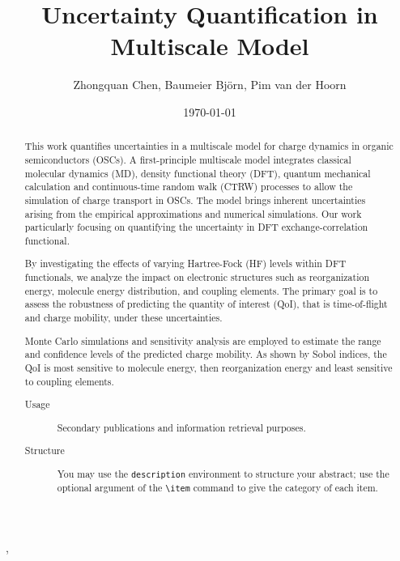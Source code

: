 \documentclass[%
 reprint,
 amsmath,amssymb,
 aps,
]{revtex4-2}
\begin{document}

\title{Uncertainty Quantification in Multiscale Model}%

\author{Zhongquan Chen, Baumeier Bj\"orn, Pim van der Hoorn}
 ,



\date{\today}%

\begin{abstract}
  This work quantifies uncertainties in a multiscale model for charge dynamics in organic semiconductors (OSCs). A first-principle multiscale model integrates classical molecular dynamics (MD), density functional theory (DFT), quantum mechanical calculation and continuous-time random walk (CTRW) processes to allow the simulation of charge transport in OSCs. The model brings inherent uncertainties arising from the empirical approximations and numerical simulations. Our work particularly focusing on quantifying the uncertainty in DFT exchange-correlation functional.

  By investigating the effects of varying Hartree-Fock (HF) levels within DFT functionals, we analyze the impact on electronic structures such as reorganization energy, molecule energy distribution, and coupling elements. The primary goal is to assess the robustness of predicting the quantity of interest (QoI), that is time-of-flight and charge mobility, under these uncertainties.
  
  Monte Carlo simulations and sensitivity analysis are employed to estimate the range and confidence levels of the predicted charge mobility. As shown by Sobol indices, the QoI is most sensitive to molecule energy, then reorganization energy and least sensitive to coupling elements.  
\begin{description}
\item[Usage]
Secondary publications and information retrieval purposes.
\item[Structure]
You may use the \texttt{description} environment to structure your abstract;
use the optional argument of the \verb+\item+ command to give the category of each item. 
\end{description}
\end{abstract}
\end{document}
